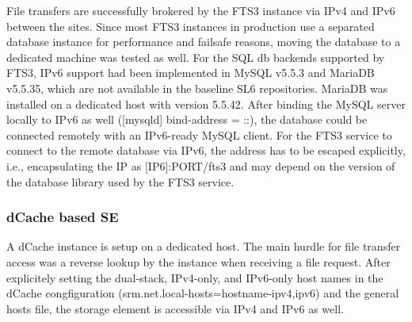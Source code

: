 File transfers are successfully brokered by the FTS3 instance via IPv4 and IPv6 between the sites. Since most FTS3 instances in production use a separated database instance for performance and failsafe reasons, moving the database to a dedicated machine was tested as well. For the SQL db backends supported by FTS3, IPv6 support had been implemented in MySQL v5.5.3 and MariaDB v5.5.35, which are not available in the baseline SL6 repositories. MariaDB was installed on a dedicated host with version 5.5.42. After binding the MySQL server locally to IPv6 as well ([mysqld] bind-address = ::), the database could be connected remotely with an IPv6-ready MySQL client. For the FTS3 service to connect to the remote database via IPv6, the address has to be escaped explicitly, i.e., encapsulating the IP as [IP6]:PORT/fts3 and may depend on the version of the database library used by the FTS3 service.

\subsubsection{dCache based SE}
A dCache instance is setup on a dedicated host. The main hurdle for file transfer access was a reverse lookup by the instance when receiving a file request. After explicitely setting the dual-stack, IPv4-only, and IPv6-only host names in the dCache congfiguration (srm.net.local-hosts=hostname-ipv4,ipv6) and the general hosts file, the storage element is accessible via IPv4 and IPv6 as well.
